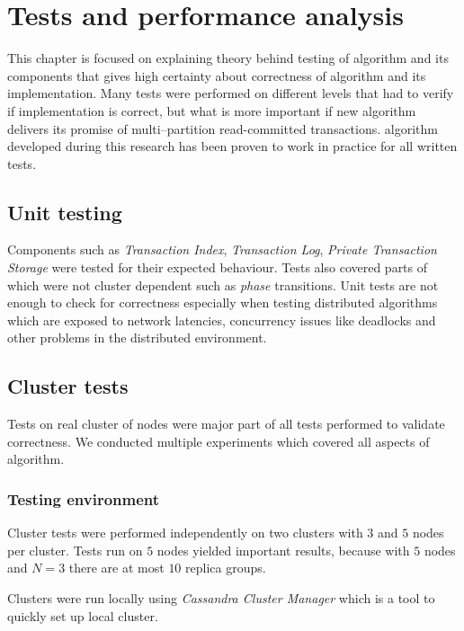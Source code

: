 
\chapter{Tests and performance analysis}\label{chapter:testing}

This chapter is focused on explaining theory behind testing of \mpt algorithm and its components that gives high certainty about correctness of algorithm and its implementation. Many tests were performed on different levels that had to verify if implementation is correct, but what is more important if new \mpt algorithm delivers its promise of multi--partition read-committed transactions. 
\mpt algorithm developed during this research has been proven to work in practice for all written tests. 

\section{Unit testing}
Components such as \emph{Transaction Index}, \emph{Transaction Log}, \emph{Private Transaction Storage} were  tested for their expected behaviour. Tests also covered parts of \mpt which were not cluster dependent such as \emph{phase} transitions. Unit tests are not enough to check for correctness especially when testing distributed algorithms which are  exposed to network latencies, concurrency issues like deadlocks and other problems in the distributed environment. 

\section{Cluster tests}
Tests on real cluster of nodes were major part of all tests performed to validate \mpt correctness. We conducted multiple experiments which covered all aspects of \mpt algorithm. 

\subsection{Testing environment}
Cluster tests were performed independently on two clusters with $3$ and $5$ nodes per cluster. Tests run on $5$ nodes yielded important results, because with $5$ nodes and $N=3$ there are at most $10$ replica groups. 

Clusters were run locally using \emph{Cassandra Cluster Manager} which is a tool to quickly set up local cluster.

